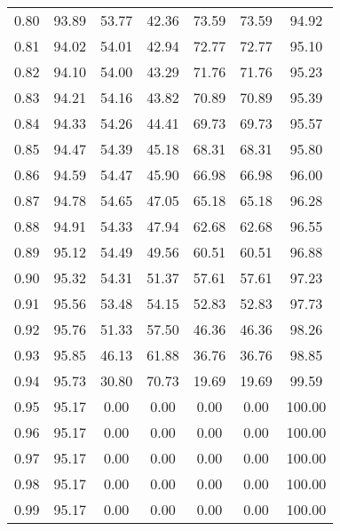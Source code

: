 \begin{tabular}{|c|c|c|c|c|c|c|}
      0.80 &     93.89 &     53.77 &      42.36 &   73.59 &      73.59 &         94.92 \\
      0.81 &     94.02 &     54.01 &      42.94 &   72.77 &      72.77 &         95.10 \\
      0.82 &     94.10 &     54.00 &      43.29 &   71.76 &      71.76 &         95.23 \\
      0.83 &     94.21 &     54.16 &      43.82 &   70.89 &      70.89 &         95.39 \\
      0.84 &     94.33 &     54.26 &      44.41 &   69.73 &      69.73 &         95.57 \\
      0.85 &     94.47 &     54.39 &      45.18 &   68.31 &      68.31 &         95.80 \\
      0.86 &     94.59 &     54.47 &      45.90 &   66.98 &      66.98 &         96.00 \\
      0.87 &     94.78 &     54.65 &      47.05 &   65.18 &      65.18 &         96.28 \\
      0.88 &     94.91 &     54.33 &      47.94 &   62.68 &      62.68 &         96.55 \\
      0.89 &     95.12 &     54.49 &      49.56 &   60.51 &      60.51 &         96.88 \\
      0.90 &     95.32 &     54.31 &      51.37 &   57.61 &      57.61 &         97.23 \\
      0.91 &     95.56 &     53.48 &      54.15 &   52.83 &      52.83 &         97.73 \\
      0.92 &     95.76 &     51.33 &      57.50 &   46.36 &      46.36 &         98.26 \\
      0.93 &     95.85 &     46.13 &      61.88 &   36.76 &      36.76 &         98.85 \\
      0.94 &     95.73 &     30.80 &      70.73 &   19.69 &      19.69 &         99.59 \\
      0.95 &     95.17 &      0.00 &       0.00 &    0.00 &       0.00 &        100.00 \\
      0.96 &     95.17 &      0.00 &       0.00 &    0.00 &       0.00 &        100.00 \\
      0.97 &     95.17 &      0.00 &       0.00 &    0.00 &       0.00 &        100.00 \\
      0.98 &     95.17 &      0.00 &       0.00 &    0.00 &       0.00 &        100.00 \\
      0.99 &     95.17 &      0.00 &       0.00 &    0.00 &       0.00 &        100.00 \\
\bottomrule
\end{tabular}
